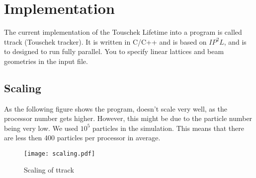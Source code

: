 \pagebreak
\section{Implementation}
The current implementation of the Touschek Lifetime into a program is called ttrack (Touschek tracker). It is written in C/C++ and is based on $IP^2L$, and is to designed to run fully parallel. You to specify linear lattices and beam geometries in the input file.
\subsection{Scaling}
As the following figure shows the program, doesn't scale very well, as the processor number gets higher. However, this might be due to the particle number being very low. We used $10^5$ particles in the simulation. This means that there are less then 400 particles per processor in average.
\begin{figure}[here]
\centering
 \texttt{[image: scaling.pdf]}
 \caption{Scaling of ttrack}
\end{figure}

